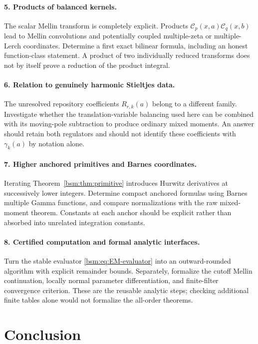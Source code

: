\documentclass[11pt,letterpaper]{article}
\numberwithin{equation}{section}
\theoremstyle{definition}\newtheorem{definition}[theorem]{Definition}
\theoremstyle{remark}\newtheorem{remark}[theorem]{Remark}
\newcommand{\Ccal}{\mathcal C}
\begin{document}
\paragraph{5. Products of balanced kernels.}
The scalar Mellin transform is completely explicit. Products
$\Ccal_p(x,a)\Ccal_q(x,b)$ lead to Mellin convolutions and potentially
coupled multiple-zeta or multiple-Lerch coordinates. Determine a
first exact bilinear formula, including an honest function-class
statement. A product of two individually reduced transforms does not
by itself prove a reduction of the product integral.

\paragraph{6. Relation to genuinely harmonic Stieltjes data.}
The unresolved repository coefficients $R_{r,k}(a)$ belong to a
different family. Investigate whether the translation-variable
balancing used here can be combined with its moving-pole subtraction
to produce ordinary mixed moments. An answer should retain both
regulators and should not identify these coefficients with
$\gamma_k(a)$ by notation alone.

\paragraph{7. Higher anchored primitives and Barnes coordinates.}
Iterating Theorem~\ref{bsm:thm:primitive} introduces Hurwitz derivatives
at successively lower integers. Determine compact anchored formulas
using Barnes multiple Gamma functions, and compare normalizations
with the raw mixed-moment theorem. Constants at each anchor should
be explicit rather than absorbed into unrelated integration constants.

\paragraph{8. Certified computation and formal analytic interfaces.}
Turn the stable evaluator \eqref{bsm:eq:EM-evaluator} into an
outward-rounded algorithm with explicit remainder bounds. Separately,
formalize the cutoff Mellin continuation, locally normal parameter
differentiation, and finite-filter convergence criterion. These are
the reusable analytic steps; checking additional finite tables alone
would not formalize the all-order theorems.

\section{Conclusion}
\end{document}
